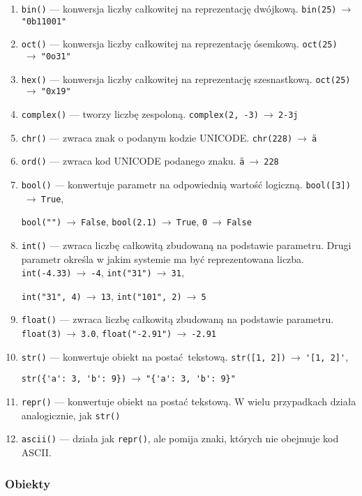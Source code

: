 \begin{enumerate}[]
    \item \verb|bin()| --- konwersja liczby całkowitej na reprezentację dwójkową. \verb|bin(25)|$\ \to\ $\verb|"0b11001"|
    \item \verb|oct()| --- konwersja liczby całkowitej na reprezentację ósemkową. \verb|oct(25)|$\ \to\ $\verb|"0o31"|
    \item \verb|hex()| --- konwersja liczby całkowitej na reprezentację szesnastkową. \verb|oct(25)|$\ \to\ $\verb|"0x19"|
    \item \verb|complex()| --- tworzy liczbę zespoloną. \verb|complex(2, -3)|$\ \to\ $\verb|2-3j|
    \item \verb|chr()| --- zwraca znak o podanym kodzie UNICODE. \verb|chr(228)|$\ \to\ $\texttt{\"a}
    \item \verb|ord()| --- zwraca kod UNICODE podanego znaku. \texttt{\"a}$\ \to\ $\verb|228|
    \item \verb|bool()| --- konwertuje parametr na odpowiednią wartość logiczną. \verb|bool([3])|$\ \to\ $\verb|True|,

    \verb|bool("")|$\ \to\ $\verb|False|, \verb|bool(2.1)|$\ \to\ $\verb|True|, \verb|0|$\ \to\ $\verb|False|
    \item \verb|int()| --- zwraca liczbę całkowitą zbudowaną na podstawie parametru. Drugi parametr określa w jakim systemie ma być reprezentowana liczba. \verb|int(-4.33)|$\ \to\ $\verb|-4|, \verb|int("31")|$\ \to\ $\verb|31|,

    \verb|int("31", 4)|$\ \to\ $\verb|13|, \verb|int("101", 2)|$\ \to\ $\verb|5|
    \item \verb|float()| --- zwraca liczbę całkowitą zbudowaną na podstawie parametru. \verb|float(3)|$\ \to\ $\verb|3.0|, \verb|float("-2.91")|$\ \to\ $\verb|-2.91|
    \item \verb|str()| --- konwertuje obiekt na postać tekstową. \verb|str([1, 2])|$\ \to\ $\verb|'[1, 2]'|,

    \verb|str({'a': 3, 'b': 9})|$\ \to\ $\verb|"{'a': 3, 'b': 9}"|
    \item \verb|repr()| --- konwertuje obiekt na postać tekstową. W wielu przypadkach działa analogicznie, jak \verb|str()|
    \item \verb|ascii()| --- działa jak \verb|repr()|, ale pomija znaki, których nie obejmuje kod ASCII.
\end{enumerate}

\subsubsection*{Obiekty}

